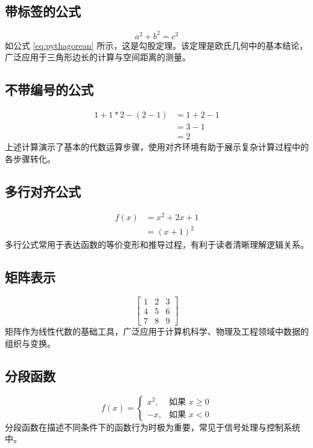 \subsection{带标签的公式}
\begin{equation}
\label{eq:pythagorean}
a^2 + b^2 = c^2
\end{equation}
如公式 \eqref{eq:pythagorean} 所示，这是勾股定理。该定理是欧氏几何中的基本结论，广泛应用于三角形边长的计算与空间距离的测量。

\subsection{不带编号的公式}

\begin{equation*}
    \begin{aligned}
        1+ 1*2 - (2-1) & = 1+ 2 - 1 \\
                       & = 3-1      \\
                       & = 2
    \end{aligned}
\end{equation*}
上述计算演示了基本的代数运算步骤，使用对齐环境有助于展示复杂计算过程中的各步骤转化。

\subsection{多行对齐公式}
\begin{equation}
\begin{split}
f(x) &= x^2 + 2x + 1 \\
     &= (x + 1)^2
\end{split}
\end{equation}
多行公式常用于表达函数的等价变形和推导过程，有利于读者清晰理解逻辑关系。

\subsection{矩阵表示}
\begin{equation}
\begin{bmatrix}
1 & 2 & 3 \\
4 & 5 & 6 \\
7 & 8 & 9
\end{bmatrix}
\end{equation}
矩阵作为线性代数的基础工具，广泛应用于计算机科学、物理及工程领域中数据的组织与变换。

\subsection{分段函数}
\begin{equation}
f(x) = 
\begin{cases}
x^2, & \text{如果 } x \geq 0 \\
-x, & \text{如果 } x < 0
\end{cases}
\end{equation}
分段函数在描述不同条件下的函数行为时极为重要，常见于信号处理与控制系统中。

